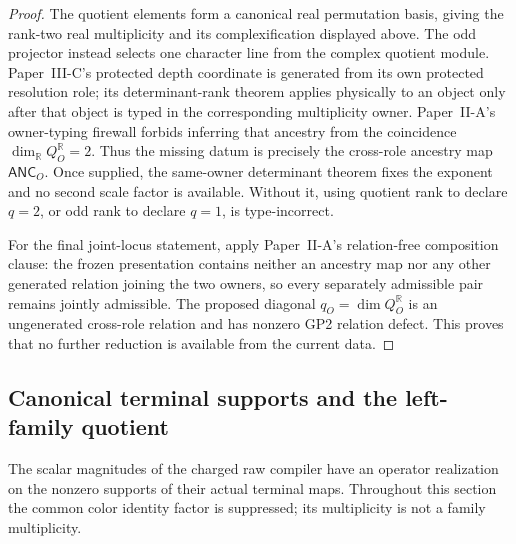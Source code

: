 \documentclass[12pt,a4paper]{article}
\begin{document}
\begin{proof}
The quotient elements form a canonical real permutation basis, giving the
rank-two real multiplicity and its complexification displayed above.  The odd
projector instead selects one character line from the complex quotient module.
Paper~III-C's protected depth coordinate is generated from its own protected
resolution role; its determinant-rank theorem applies physically to an object
only after that object is typed in the corresponding multiplicity owner.
Paper~II-A's owner-typing firewall forbids inferring that ancestry from the
coincidence \(\dim_{\mathbb R}Q_O^{\mathbb R}=2\).  Thus the missing datum is
precisely the cross-role ancestry map \(\mathsf{ANC}_O\).  Once supplied, the
same-owner determinant theorem fixes the exponent and no second scale factor is
available.  Without it, using quotient rank to declare \(q=2\), or odd rank to
declare \(q=1\), is type-incorrect.

For the final joint-locus statement, apply Paper~II-A's relation-free
composition clause: the frozen presentation contains neither an ancestry map
nor any other generated relation joining the two owners, so every separately
admissible pair remains jointly admissible.  The proposed diagonal
\(q_O=\dim Q_O^{\mathbb R}\) is an ungenerated cross-role relation and has
nonzero GP2 relation defect.  This proves that no further reduction is
available from the current data.
\end{proof}

\subsection{Canonical terminal supports and the left-family quotient}
\label{p6:sec:v585-terminal-supports}
The scalar magnitudes of the charged raw compiler have an operator
realization on the nonzero supports of their actual terminal maps.
Throughout this section the common color identity factor is suppressed;
its multiplicity is not a family multiplicity.
\end{document}
